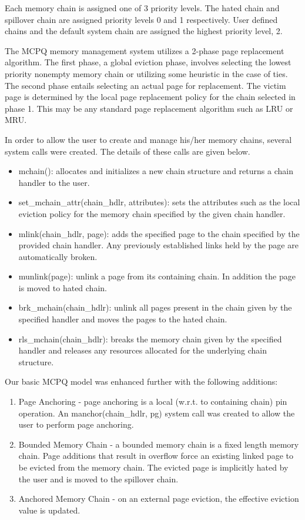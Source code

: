 \documentclass[10pt,a4paper,twocolumn]{article}
\begin{document}
Each memory chain is assigned one of 3 priority levels. The hated chain and spillover chain are
assigned priority levels 0 and 1 respectively. User defined chains and the default system chain are
assigned the highest priority level, 2. 

The MCPQ memory management system utilizes a 2-phase page replacement algorithm. The first phase, a
global eviction phase, involves selecting the lowest priority nonempty memory chain or utilizing
some heuristic in the case of ties. The second phase entails selecting an actual page for
replacement.  The victim page is determined by the local page replacement policy for the chain
selected in phase 1. This may be any standard page replacement algorithm such as LRU or MRU.  
 
In order to allow the user to create and manage his/her memory chains, several system calls were created. The details of these calls are given below.

\begin{itemize}
  \item mchain(): allocates and initializes a new chain structure and returns a chain handler to the user.
  \item set\_mchain\_attr(chain\_hdlr, attributes): sets the attributes such as the local eviction policy for the memory chain specified by the given chain handler.
  \item mlink(chain\_hdlr, page): adds the specified page to the chain specified by the provided chain handler. Any previously established links held by the page are automatically broken.
  \item munlink(page): unlink a page from its containing chain. In addition the page is moved to hated chain.
  \item brk\_mchain(chain\_hdlr): unlink all pages present in the chain given by the specified handler and moves the pages to the hated chain.
  \item rls\_mchain(chain\_hdlr): breaks the memory chain given by the specified handler and releases any resources allocated for the underlying chain structure.
\end{itemize}

Our basic MCPQ model was enhanced further with the following additions:

\begin{enumerate}
  \item Page Anchoring - page anchoring is a local (w.r.t. to containing chain) pin operation. An manchor(chain\_hdlr, pg) system call was created to allow the user to perform page anchoring.
  \item Bounded Memory Chain - a bounded memory chain is a fixed length memory chain. Page additions that result in overflow force an existing linked page to be evicted from the memory chain. The evicted page is implicitly hated by the user and is moved to the spillover chain.
  \item Anchored Memory Chain ­- on an external page eviction, the effective eviction value is updated. 
\end{enumerate}
\end{document}
